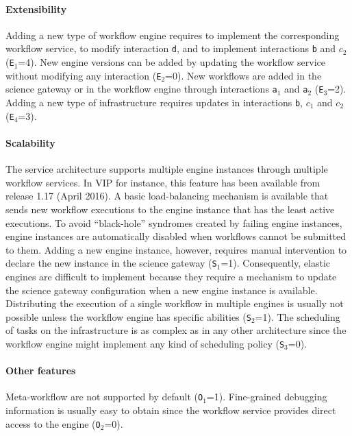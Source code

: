 \documentclass[preprint,3p,twocolumn]{elsarticle}
\begin{document}
\paragraph{Extensibility} Adding a new type of workflow engine requires
to implement the corresponding workflow service, to modify interaction
\texttt{d}, and to implement interactions \texttt{b} and
\texttt{$c_2$} (\texttt{E$_1$}=4). New engine versions can be added by
updating the workflow service without modifying any interaction
(\texttt{E$_2$}=0).  New workflows are added in the science gateway or
in the workflow engine through interactions \texttt{a$_1$} and \texttt{a$_2$}
(\texttt{E$_3$}=2). Adding a new type of infrastructure requires
updates in interactions \texttt{b}, \texttt{$c_1$} and \texttt{$c_2$}
(\texttt{E$_4$}=3). 

\paragraph{Scalability} The service architecture supports multiple
engine instances through multiple workflow services. In VIP for
instance, this feature has been available from release 1.17 (April
2016). A basic load-balancing mechanism is available that sends new
workflow executions to the engine instance that has the least active
executions. To avoid ``black-hole'' syndromes created by failing
engine instances, engine instances are automatically disabled when
workflows cannot be submitted to them. Adding a new engine instance,
however, requires manual intervention to declare the new instance in
the science gateway (\texttt{S$_1$}=1). Consequently, elastic engines
are difficult to implement because they require a mechanism to update
the science gateway configuration when a new engine instance is
available. Distributing the execution of a single
workflow in multiple engines is usually not possible unless the
workflow engine has specific abilities (\texttt{S$_2$}=1). The
scheduling of tasks on the infrastructure is as complex as in any
other architecture since the workflow engine might implement any kind
of scheduling policy (\texttt{S$_3$}=0).

\paragraph{Other features} Meta-workflow are not supported by default
(\texttt{O$_1$}=1). Fine-grained debugging information is usually easy
to obtain since the workflow service provides direct access to the
engine (\texttt{O$_2$}=0).
\end{document}
